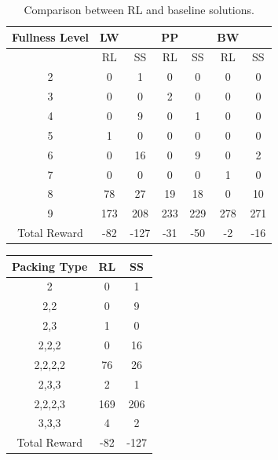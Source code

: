 \ifx
\begin{table}[h!]
	\centering
	\begin{tabular}{ |c|cc|cc|cc| } 
			\hline
Fullness Level&LW&&PP&&BW& \\
\hline
& RL&SS&RL&SS&RL&SS \\
\hline

2 & 0 & 1 & 0 & 0 & 0 & 0 \\
\hline
3 & 0 & 0 & 2 & 0 & 0 & 0 \\
\hline
4 & 0 & 9 & 0 & 1 & 0 & 0 \\
\hline
5 & 1 & 0 & 0 & 0 & 0 & 0 \\
\hline
6 & 0 & 16 & 0 & 9 & 0 & 2 \\
\hline
7 & 0 & 0 & 0 & 0 & 1 & 0 \\
\hline
8 & 78 & 27 & 19 & 18 & 0 & 10 \\
\hline
9 & 173 & 208 & 233 & 229 & 278 & 271 \\
\hline
Total Reward & -82 & -127 & -31 & -50 & -2 & -16 \\
		\hline
	\end{tabular}
	\caption{Comparison between RL and baseline solutions.}
	\label{table:bin_packing_RL_baseline_sol_comp}
\end{table}
\fi
\ifx
\begin{table}[h!]
	\centering
	\begin{tabular}{ |c|c|c| } 
		\hline
		Packing Type & RL & SS \\ 
		\hline
		2 & 0 & 1  \\ 
		\hline
		2,2 & 0 & 9 \\
		\hline
		2,3 & 1 & 0 \\
		\hline
		2,2,2 & 0 & 16 \\   
		\hline
		2,2,2,2 & 76 & 26 \\
		\hline
		2,3,3 & 2 & 1 \\
		\hline
		2,2,2,3 & 169 & 206 \\
		\hline
		3,3,3 & 4 & 2 \\
		\hline
		Total Reward & -82 &-127 \\
		\hline
	\end{tabular}
\end{table}

